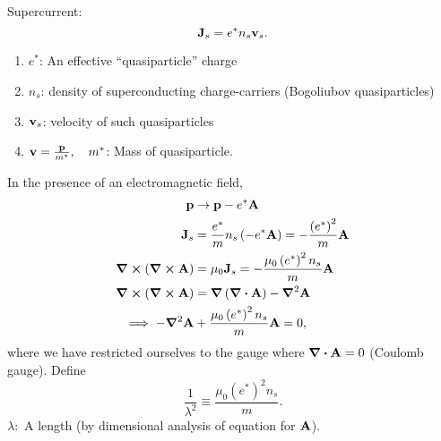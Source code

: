 Supercurrent:
\begin{equation} 
\vb J_s = e^*n_s\vb v_s.
\end{equation}
\begin{enumerate}[]
	\item $e^*$: An effective ``quasiparticle'' charge
	\item $n_s$: density of superconducting charge-carriers (Bogoliubov quasiparticles)
	\item $\vb v_s$: velocity of such quasiparticles
	\item $\vb v = \frac{\vb p}{m^*},\quad m^*$: Mass of quasiparticle.
\end{enumerate}
In the presence of an electromagnetic field,
\begin{align} 
\vb p &\rightarrow \vb p - e^*\vb A\\
\vb J_s &= \frac{e^*}{m}n_s\left( -e^*\vb A \right) = -\frac{\left(e^*\right)^2}{m}\vb A \\
\curl{(\curl{\vb A})} &= \mu_0\vb J_s = -\frac{\mu_0\left( e^* \right)^2n_s}{m}\vb A\\
\curl{\left( \curl{\vb A \right)}} &= \grad{\left( \div{\vb A} \right)} -\grad^2\vb A \\
\implies -\grad^2\vb A &+  \frac{\mu_0\left( e^* \right)^2n_s}{m}\vb A = 0,
\end{align}
where we have restricted ourselves to the gauge where $\div{\vb A} = 0$ (Coulomb gauge).
Define 
\begin{equation} 
\frac{1}{\lambda^2} \equiv \frac{\mu_0\left( e^* \right)^2n_s}{m}.
\end{equation}
$\lambda:$ A length (by dimensional analysis of equation for $\vb A$).

